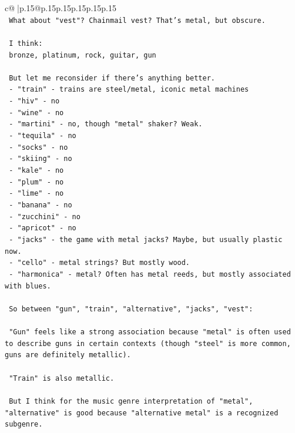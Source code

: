 \documentclass{article}
\begin{document}
{\begin{supertabular}{c@{$\;$}|p{.15\linewidth}@{}p{.15\linewidth}p{.15\linewidth}p{.15\linewidth}p{.15\linewidth}p{.15\linewidth}}
{{{\\ 
\texttt{ What about "vest"? Chainmail vest? That's metal, but obscure.} \\
\\ 
\texttt{ I think:} \\
\texttt{ bronze, platinum, rock, guitar, gun} \\
\\ 
\texttt{ But let me reconsider if there's anything better.} \\
\texttt{ {-} "train" {-} trains are steel/metal, iconic metal machines} \\
\texttt{ {-} "hiv" {-} no} \\
\texttt{ {-} "wine" {-} no} \\
\texttt{ {-} "martini" {-} no, though "metal" shaker? Weak.} \\
\texttt{ {-} "tequila" {-} no} \\
\texttt{ {-} "socks" {-} no} \\
\texttt{ {-} "skiing" {-} no} \\
\texttt{ {-} "kale" {-} no} \\
\texttt{ {-} "plum" {-} no} \\
\texttt{ {-} "lime" {-} no} \\
\texttt{ {-} "banana" {-} no} \\
\texttt{ {-} "zucchini" {-} no} \\
\texttt{ {-} "apricot" {-} no} \\
\texttt{ {-} "jacks" {-} the game with metal jacks? Maybe, but usually plastic now.} \\
\texttt{ {-} "cello" {-} metal strings? But mostly wood.} \\
\texttt{ {-} "harmonica" {-} metal? Often has metal reeds, but mostly associated with blues.} \\
\\ 
\texttt{ So between "gun", "train", "alternative", "jacks", "vest":} \\
\\ 
\texttt{ "Gun" feels like a strong association because "metal" is often used to describe guns in certain contexts (though "steel" is more common, guns are definitely metallic).} \\
\\ 
\texttt{ "Train" is also metallic.} \\
\\ 
\texttt{ But I think for the music genre interpretation of "metal", "alternative" is good because "alternative metal" is a recognized subgenre.} \\
}}}
\end{supertabular}}
\end{document}
